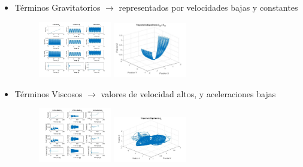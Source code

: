 	\begin{itemize}
		\item Términos Gravitatorios $ \rightarrow $ representados por velocidades bajas y constantes
		\begin{figure}[h]
			\centering
			\includegraphics[width=0.3\textwidth]{graftheta10y11}
			\includegraphics[width=0.3\textwidth]{Traytheta10y11}
		\end{figure}
	
		\item Términos Viscosos $ \rightarrow $ valores de velocidad altos, y aceleraciones bajas
			\begin{figure}[h]
			\centering
			\includegraphics[width=0.3\textwidth]{graftheta9}
			\includegraphics[width=0.3\textwidth]{Traytheta9}
		\end{figure}


\end{itemize}
